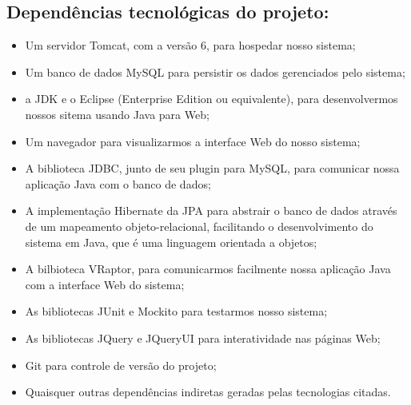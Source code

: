 \documentclass[11pt, a4paper]{article}
\begin{document}
        \subsection{Dependências tecnológicas do projeto:}
            \begin{itemize}
                \item Um servidor Tomcat, com a versão 6, para hospedar nosso
                sistema;
                
                \item Um banco de dados MySQL para persistir os dados
                gerenciados pelo sistema;
                
                \item a JDK e o Eclipse (Enterprise Edition ou equivalente),
                para desenvolvermos nossos sitema usando Java para Web;
                
                \item Um navegador para visualizarmos a interface Web do nosso
                sistema;
                
                \item A biblioteca JDBC, junto de seu plugin para MySQL, para 
				comunicar nossa aplicação Java com o banco de dados;
                
                \item A implementação Hibernate da JPA para abstrair o banco de
                dados através de um mapeamento objeto-relacional, facilitando
                o desenvolvimento do sistema em Java, que é uma linguagem
                orientada a objetos;
                
                \item A bilbioteca VRaptor, para comunicarmos facilmente nossa
                aplicação Java com a interface Web do sistema;
                
                \item As bibliotecas JUnit e Mockito para testarmos nosso
                sistema;
				
				\item As bibliotecas JQuery e JQueryUI para interatividade nas
				páginas Web;
                
                \item Git para controle de versão do projeto;
                
                \item Quaisquer outras dependências indiretas geradas pelas
                tecnologias citadas.
            \end{itemize}
\end{document}
